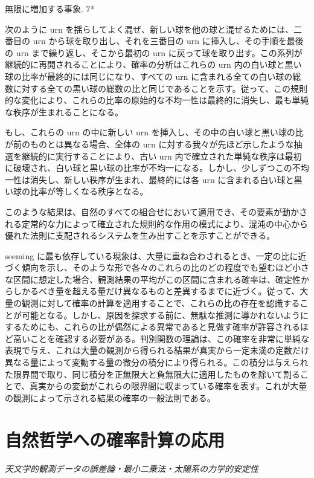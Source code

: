 \documentclass[a4paper,11pt,openany]{ltjsbook}
\begin{document}
無限に増加する事象. 7*

次のように urn を揺らしてよく混ぜ、新しい球を他の球と混ぜるためには、二番目の urn から球を取り出し、それを三番目の urn に挿入し、その手順を最後の urn まで繰り返し、そこから最初の urn に戻って球を取り出す。この系列が継続的に再開されることにより、確率の分析はこれらの urn 内の白い球と黒い球の比率が最終的には同じになり、すべての urn に含まれる全ての白い球の総数に対する全ての黒い球の総数の比と同じであることを示す。従って、この規則的な変化により、これらの比率の原始的な不均一性は最終的に消失し、最も単純な秩序が生まれることになる。

もし、これらの urn の中に新しい urn を挿入し、その中の白い球と黒い球の比が前のものとは異なる場合、全体の urn に対する我々が先ほど示したような抽選を継続的に実行することにより、古い urn 内で確立された単純な秩序は最初に破壊され、白い球と黒い球の比率が不均一になる。しかし、少しずつこの不均一性は消失し、新しい秩序が生まれ、最終的には各 urn に含まれる白い球と黒い球の比率が等しくなる秩序となる。

このような結果は、自然のすべての組合せにおいて適用でき、その要素が動かされる定常的な力によって確立された規則的な作用の模式により、混沌の中心から優れた法則に支配されるシステムを生み出すことを示すことができる。

seeming に最も依存している現象は、大量に重ね合わされるとき、一定の比に近づく傾向を示し、そのような形で各々のこれらの比のどの程度でも望むほど小さな区間に想定した場合、観測結果の平均がこの区間に含まれる確率は、確定性からしかるべき量を超える量だけ異なるものと差異するまでに近づく。従って、大量の観測に対して確率の計算を適用することで、これらの比の存在を認識することが可能となる。しかし、原因を探求する前に、無駄な推測に導かれないようにするためにも、これらの比が偶然による異常であると見做す確率が許容されるほど高いことを確認する必要がある。判別関数の理論は、この確率を非常に単純な表現で与え、これは大量の観測から得られる結果が真実から一定未満の定数だけ異なる量によって変動する量の微分の積分により得られる。この積分は与えられた限界間で取り、同じ積分を正無限大と負無限大に適用したものを除いて割ることで、真実からの変動がこれらの限界間に収まっている確率を表す。これが大量の観測によって示される結果の確率の一般法則である。

\newpage

\chapter{自然哲学への確率計算の応用}
\label{ch:ix}

\begin{center}
\large\textit{天文学的観測データの誤差論・最小二乗法・太陽系の力学的安定性}
\end{center}
\vspace{4mm}
\end{document}
